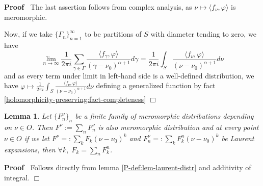 \documentclass{article}
\newcommand{\assign}{:=}
\newenvironment{proof}{\noindent\textbf{Proof\ }}{\hspace*{\fill}$\Box$\medskip}
\numberwithin{definition}{section}
\newtheorem{lemma}{Lemma}
\numberwithin{lemma}{section}
\numberwithin{proposition}{section}
{\theorembodyfont{\rmfamily}\newtheorem{remark}{Remark}
\numberwithin{remark}{section}
}
\begin{document}
\begin{proof}
  The last assertion follows from complex analysis, as $\nu \mapsto \langle
  f_{\nu}, \varphi \rangle$ is meromorphic.
  
  Now, if we take $\{ \Gamma_n \}_{n = 1}^{\infty}$ to be partitions of $S$
  with diameter tending to zero, we have
  \[ \lim_{n \rightarrow \infty} \frac{1}{2 \pi i} \sum_{\gamma \in \Gamma}
     \frac{\langle f_{\gamma}, \varphi \rangle}{( \gamma - \nu_0)^{\alpha +
     1}} d \gamma_{} = \frac{1}{2 \pi i} \int_S \frac{\langle f_{\nu}, \varphi
     \rangle}{( \nu - \nu_0)^{\alpha + 1}} d \nu \]
  and as every term under limit in left-hand side is a well-defined
  distribution, we have $\varphi \mapsto \frac{1}{2 \pi i} \int_S
  \frac{\langle f_{\nu}, \varphi \rangle}{( \nu - \nu_0)^{\alpha + 1}} d \nu$
  defining a generalized function by fact
  \ref{holomorphicity-preserving:fact-completeness}
\end{proof}

\begin{lemma}
  \label{P-def:lem-mero-addition}Let $\{ F_n^{\nu} \}_n$ be a finite family of
  meromorphic distributions depending on $\nu \in O$. Then $F^{\nu} \assign
  \sum_n F_n^{\nu}$ is also meromorphic distribution and at every point $\nu
  \in O$ if we let $F^{\nu} = : \sum_k F_k^{} ( \nu - \nu_0)^k$ and $F^{\nu}_n
  = : \sum_k F^n_k ( \nu - \nu_0)^k$ be Laurent expansions, then $\forall k,
  \; F_k = \sum_n F_k^n$.
\end{lemma}

\begin{proof}
  Follows directly from lemma \ref{P-def:lem-laurent-distr} and additivity of
  integral.
\end{proof}
\end{document}

